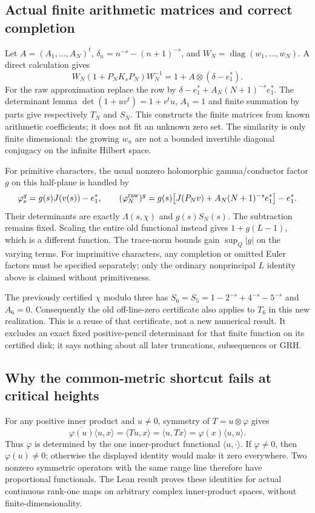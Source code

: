 \subsection{Actual finite arithmetic matrices and correct completion}
Let $A=(A_1,\ldots,A_N)^t$, $\delta_n=n^{-s}-(n+1)^{-s}$, and $W_N=\operatorname{diag}(w_1,\ldots,w_N)$. A direct calculation gives
\[
 W_N(1+P_NK_sP_N)W_N^{-1}
     =1+A\otimes(\delta-e_1^*).
\]
For the raw approximation replace the row by
$\delta-e_1^*+A_N(N+1)^{-s}e_1^*$. The determinant lemma $\det(1+uv^t)=1+v^tu$, $A_1=1$ and finite summation by parts give respectively $T_N$ and $S_N$. This constructs the finite matrices from known arithmetic coefficients; it does not fit an unknown zero set. The similarity is only finite dimensional: the growing $w_n$ are not a bounded invertible diagonal conjugacy on the infinite Hilbert space.

For primitive characters, the usual nonzero holomorphic gamma/conductor factor $g$ on this half-plane is handled by
\[
 \varphi_s^g=g(s)J(v(s))-e_1^*,\qquad
 (\varphi_N^{\rm raw})^g
   =g(s)\bigl[J(P_Nv)+A_N(N+1)^{-s}e_1^*\bigr]-e_1^*.
\]
Their determinants are exactly $\Lambda(s,\chi)$ and $g(s)S_N(s)$. The subtraction remains fixed. Scaling the entire old functional instead gives $1+g(L-1)$, which is a different function. The trace-norm bounds gain $\sup_Q|g|$ on the varying terms. For imprimitive characters, any completion or omitted Euler factors must be specified separately; only the ordinary nonprincipal $L$ identity above is claimed without primitiveness.

The previously certified $\chi$ modulo three has $S_6=S_5=1-2^{-s}+4^{-s}-5^{-s}$ and $A_6=0$. Consequently the old off-line-zero certificate also applies to $T_6$ in this new realization. This is a reuse of that certificate, not a new numerical result. It excludes an exact fixed positive-pencil determinant for that finite function on its certified disk; it says nothing about all later truncations, subsequences or GRH.

\subsection{Why the common-metric shortcut fails at critical heights}
For any positive inner product and $u\ne0$, symmetry of $T=u\otimes\varphi$ gives
\[
 \overline{\varphi(u)}\langle u,x\rangle
   =\langle Tu,x\rangle=\langle u,Tx\rangle
   =\varphi(x)\langle u,u\rangle.
\]
Thus $\varphi$ is determined by the one inner-product functional $\langle u,\cdot\rangle$. If $\varphi\ne0$, then $\varphi(u)\ne0$; otherwise the displayed identity would make it zero everywhere. Two nonzero symmetric operators with the same range line therefore have proportional functionals. The Lean result proves these identities for actual continuous rank-one maps on arbitrary complex inner-product spaces, without finite-dimensionality.

